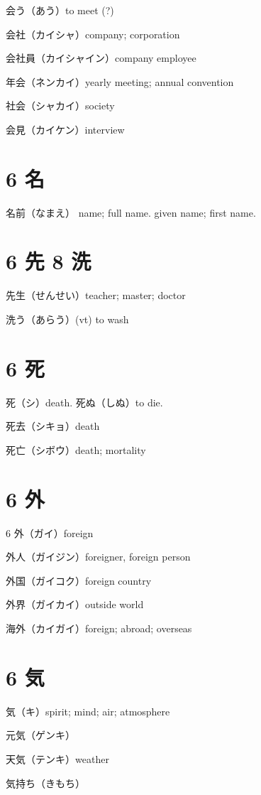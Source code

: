 会う（あう）to meet (?)

会社（カイシャ）company; corporation

会社員（カイシャイン）company employee

年会（ネンカイ）yearly meeting; annual convention

社会（シャカイ）society

会見（カイケン）interview

\section{6 名}

名前（なまえ）
name; full name.
given name; first name.

\section{6 先 8 洗}

先生（せんせい）teacher; master; doctor

洗う（あらう）(vt) to wash

\section{6 死}

死（シ）death.
死ぬ（しぬ）to die.

死去（シキョ）death

死亡（シボウ）death; mortality

\section{6 外}

6 外（ガイ）foreign

外人（ガイジン）foreigner, foreign person

外国（ガイコク）foreign country

外界（ガイカイ）outside world

海外（カイガイ）foreign; abroad; overseas

\section{6 気}

気（キ）spirit; mind; air; atmosphere

元気（ゲンキ）

天気（テンキ）weather

気持ち（きもち）

